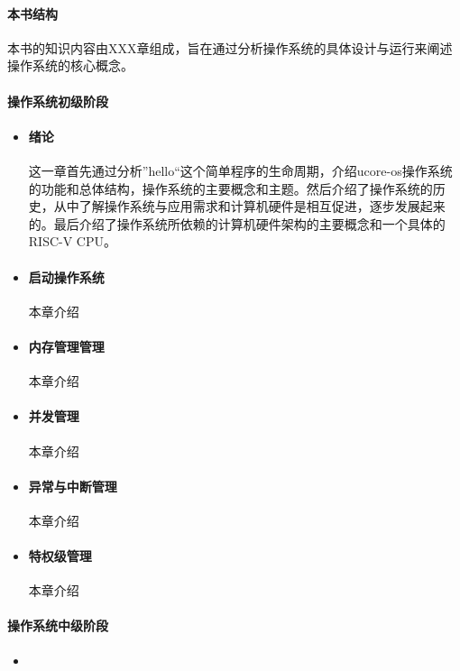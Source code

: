 \documentclass{zhbook}
\begin{document}
\begin{preface}
\paragraph{本书结构}

本书的知识内容由XXX章组成，旨在通过分析操作系统的具体设计与运行来阐述操作系统的核心概念。

\paragraph{操作系统初级阶段}	

\begin{itemize}
	\item
	\paragraph{绪论} 这一章首先通过分析”hello“这个简单程序的生命周期，介绍ucore-os操作系统的功能和总体结构，操作系统的主要概念和主题。然后介绍了操作系统的历史，从中了解操作系统与应用需求和计算机硬件是相互促进，逐步发展起来的。最后介绍了操作系统所依赖的计算机硬件架构的主要概念和一个具体的RISC-V CPU。

	\item
	\paragraph{启动操作系统}本章介绍
	\item
	\paragraph{内存管理管理}本章介绍
	\item
	\paragraph{并发管理}本章介绍
	\item
	\paragraph{异常与中断管理}本章介绍
	\item
	\paragraph{特权级管理}本章介绍
\end{itemize}


\paragraph{操作系统中级阶段}
\begin{itemize}
	\item

\end{itemize}
\end{preface}
\end{document}
